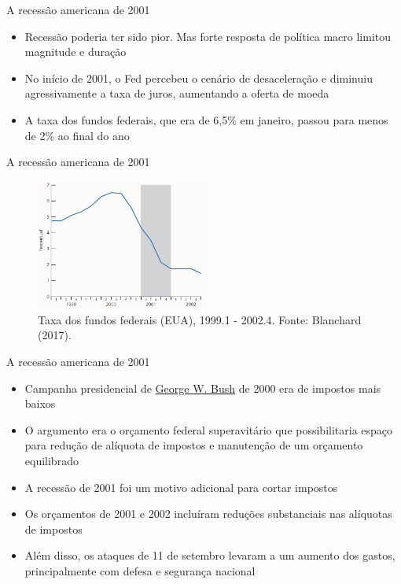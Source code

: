 \documentclass[10pt]{beamer}
\begin{document}
\begin{frame}{A recessão americana de 2001}
\begin{itemize}
    \item Recessão poderia ter sido pior. Mas forte resposta de política macro limitou magnitude e duração
    \bigskip
    \item No início de 2001, o Fed percebeu o cenário de desaceleração e diminuiu agressivamente a taxa de juros, aumentando a oferta de moeda
    \bigskip
    \item A taxa dos fundos federais, que era de 6,5\% em janeiro, passou para menos de 2\% ao final do ano
\end{itemize}
\end{frame}

\begin{frame}{A recessão americana de 2001}
\begin{figure}
    \centering
    \includegraphics[width=0.5\textwidth]{./figures/aula082_fig12.JPG}
    \caption{Taxa dos fundos federais (EUA), 1999.1 - 2002.4. Fonte: Blanchard (2017).}
    \label{fig6}
\end{figure}
\end{frame}

\begin{frame}{A recessão americana de 2001}
\begin{itemize}
    \item Campanha presidencial de \href{https://en.wikipedia.org/wiki/George_W._Bush_2000_presidential_campaign}{George W. Bush} de 2000 era de impostos mais baixos
    \bigskip
    \item O argumento era o orçamento federal superavitário que possibilitaria espaço para redução de alíquota de impostos e manutenção de um orçamento equilibrado
    \bigskip
    \item A recessão de 2001 foi um motivo adicional para cortar impostos
    \bigskip
    \item Os orçamentos de 2001 e 2002 incluíram reduções substanciais nas alíquotas de impostos
    \bigskip
    \item Além disso, os ataques de 11 de setembro levaram a um aumento dos gastos, principalmente com defesa e segurança nacional
\end{itemize}
\end{frame}
\end{document}
